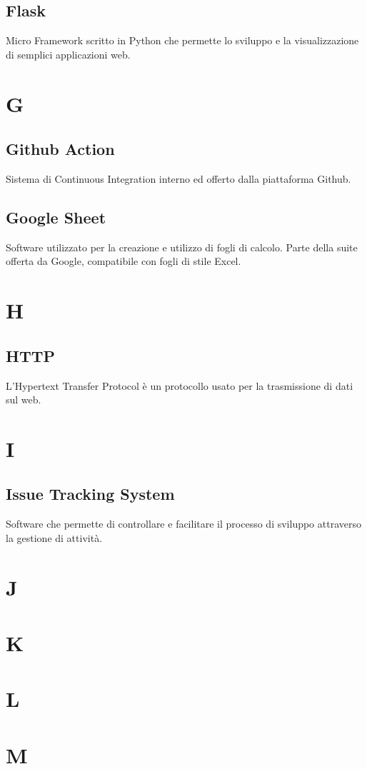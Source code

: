 \subsection{Flask}
Micro Framework scritto in Python che permette lo sviluppo e la visualizzazione di semplici applicazioni web.
\newpage
\section{G}
\subsection{Github Action}
Sistema di Continuous Integration interno ed offerto dalla piattaforma Github.
\subsection{Google Sheet}
Software utilizzato per la creazione e utilizzo di fogli di calcolo. Parte della suite offerta da Google, compatibile con fogli di stile Excel.
\newpage
\section{H}
\subsection{HTTP}
L'Hypertext Transfer Protocol è un protocollo usato per la trasmissione di dati sul web.
\section{I}
\subsection{Issue Tracking System}
Software che permette di controllare e facilitare il processo di sviluppo attraverso la gestione di attività.
\newpage
\section{J}
\section{K}
\section{L}
\section{M}
